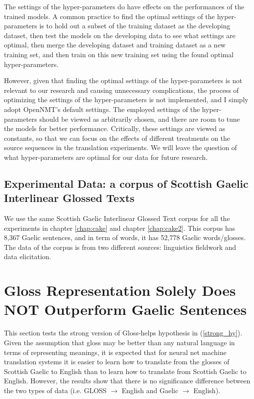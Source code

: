 \documentclass[final]{ua-thesis}
\numberwithin{equation}{section}
\begin{document}
The settings of the hyper-parameters do have effects on the performances of the trained models.
A common practice to find the optimal settings of the hyper-parameters is to hold out a subset of the training dataset as the developing dataset, then test the models on the developing data to see what settings are optimal, then merge the developing dataset and training dataset as a new training set, and then train on this new training set using the found optimal hyper-parameters.

However, given that finding the optimal settings of the hyper-parameters is not relevant to our research and causing unnecessary complications, the process of optimizing the settings of the hyper-parameters is not implemented, and I simply adopt OpenNMT's default settings. The employed settings of the hyper-parameters should be viewed as arbitrarily chosen, and there are room to tune the models for better performance. Critically, these settings are viewed as constants, so that we can focus on the effects of different treatments on the source sequences in the translation experiments.  We will leave the question of what hyper-parameters are optimal for our data for future research.

\subsection{Experimental Data: a corpus of Scottish Gaelic Interlinear Glossed Texts}

We use the same Scottish Gaelic Interlinear Glossed Text corpus \citep{gaelic_igt} for all the experiments in chapter \ref{chap:cake} and chapter \ref{chap:cake2}. 
This corpus has 8,367 Gaelic sentences, and in term of words, it has 52,778 Gaelic words/glosses. The data of the corpus is from two different sources: linguistics fieldwork and data elicitation.


\section{Gloss Representation Solely Does NOT Outperform Gaelic Sentences} \label{gd_to_gl_to_en}
This section tests the strong version of Gloss-helps hypothesis in (\ref{strong_hy}).
Given the assumption that gloss may be better than any natural language in terms of representing meanings, it is expected that for neural net machine translation systems it is easier to learn how to translate from the glosses of Scottish Gaelic to English than to learn how to translate from Scottish Gaelic to English. However, the results show that there is no significance difference between the two types of data (i.e. GLOSS $\rightarrow$ English and Gaelic $\rightarrow$ English).
\end{document}
